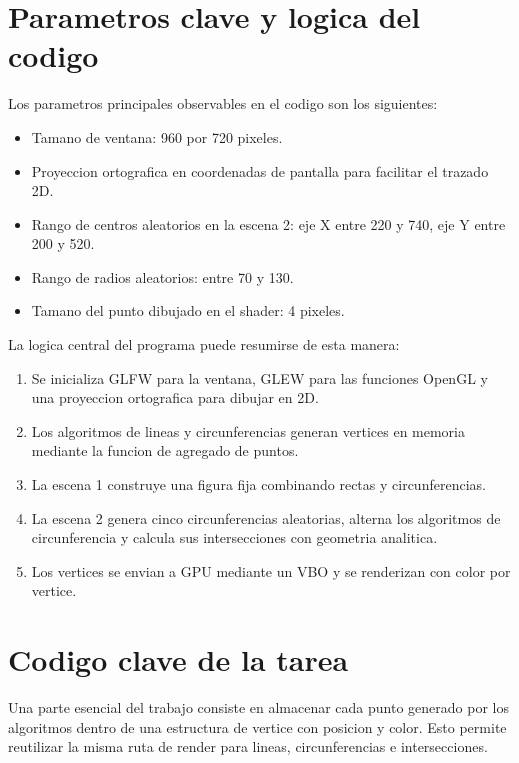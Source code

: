 \documentclass[12pt,a4paper]{article}
\begin{document}
\section{Parametros clave y logica del codigo}

Los parametros principales observables en el codigo son los siguientes:

\begin{itemize}
	\item Tamano de ventana: 960 por 720 pixeles.
	\item Proyeccion ortografica en coordenadas de pantalla para facilitar el trazado 2D.
	\item Rango de centros aleatorios en la escena 2: eje X entre 220 y 740, eje Y entre 200 y 520.
	\item Rango de radios aleatorios: entre 70 y 130.
	\item Tamano del punto dibujado en el shader: 4 pixeles.
\end{itemize}

La logica central del programa puede resumirse de esta manera:

\begin{enumerate}
	\item Se inicializa GLFW para la ventana, GLEW para las funciones OpenGL y una proyeccion ortografica para dibujar en 2D.
	\item Los algoritmos de lineas y circunferencias generan vertices en memoria mediante la funcion de agregado de puntos.
	\item La escena 1 construye una figura fija combinando rectas y circunferencias.
	\item La escena 2 genera cinco circunferencias aleatorias, alterna los algoritmos de circunferencia y calcula sus intersecciones con geometria analitica.
	\item Los vertices se envian a GPU mediante un VBO y se renderizan con color por vertice.
\end{enumerate}

\section{Codigo clave de la tarea}

Una parte esencial del trabajo consiste en almacenar cada punto generado por los algoritmos dentro de una estructura de vertice con posicion y color. Esto permite reutilizar la misma ruta de render para lineas, circunferencias e intersecciones.
\end{document}
